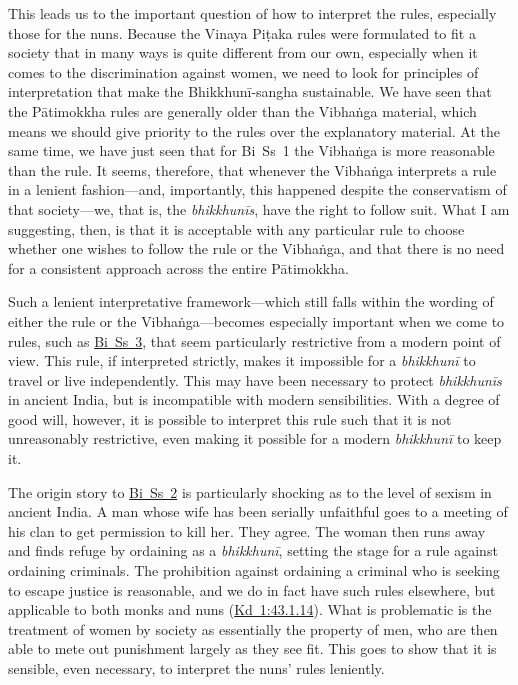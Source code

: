 \documentclass[12pt,openany]{book}%
\begin{document}
This leads us to the important question of how to interpret the rules, especially those for the nuns. Because the Vinaya \textsanskrit{Piṭaka} rules were formulated to fit a society that in many ways is quite different from our own, especially when it comes to the discrimination against women, we need to look for principles of interpretation that make the \textsanskrit{Bhikkhunī}-sangha sustainable. We have seen that the \textsanskrit{Pātimokkha} rules are generally older than the \textsanskrit{Vibhaṅga} material, which means we should give priority to the rules over the explanatory material. At the same time, we have just seen that for Bi Ss 1 the \textsanskrit{Vibhaṅga} is more reasonable than the rule. It seems, therefore, that whenever the \textsanskrit{Vibhaṅga} interprets a rule in a lenient fashion—and, importantly, this happened despite the conservatism of that society—we, that is, the \textit{\textsanskrit{bhikkhunīs}}, have the right to follow suit. What I am suggesting, then, is that it is acceptable with any particular rule to choose whether one wishes to follow the rule or the \textsanskrit{Vibhaṅga}, and that there is no need for a consistent approach across the entire \textsanskrit{Pātimokkha}.

Such a lenient interpretative framework—which still falls within the wording of either the rule or the \textsanskrit{Vibhaṅga}—becomes especially important when we come to rules, such as \href{https://suttacentral.net/pli-tv-bi-vb-ss3/en/brahmali\#4.14.1}{Bi~Ss~3}, that seem particularly restrictive from a modern point of view. This rule, if interpreted strictly, makes it impossible for a \textit{\textsanskrit{bhikkhunī}} to travel or live independently. This may have been necessary to protect \textit{\textsanskrit{bhikkhunīs}} in ancient India, but is incompatible with modern sensibilities. With a degree of good will, however, it is possible to interpret this rule such that it is not unreasonably restrictive, even making it possible for a modern \textit{\textsanskrit{bhikkhunī}} to keep it.

The origin story to \href{https://suttacentral.net/pli-tv-bi-vb-ss2/en/brahmali\#1.1}{Bi~Ss~2} is particularly shocking as to the level of sexism in ancient India. A man whose wife has been serially unfaithful goes to a meeting of his clan to get permission to kill her. They agree. The woman then runs away and finds refuge by ordaining as a \textit{\textsanskrit{bhikkhunī}}, setting the stage for a rule against ordaining criminals. The prohibition against ordaining a criminal who is seeking to escape justice is reasonable, and we do in fact have such rules elsewhere, but applicable to both monks and nuns (\href{https://suttacentral.net/pli-tv-kd1/en/brahmali\#43.1.14}{Kd~1:43.1.14}). What is problematic is the treatment of women by society as essentially the property of men, who are then able to mete out punishment largely as they see fit. This goes to show that it is sensible, even necessary, to interpret the nuns’ rules leniently.
\end{document}
